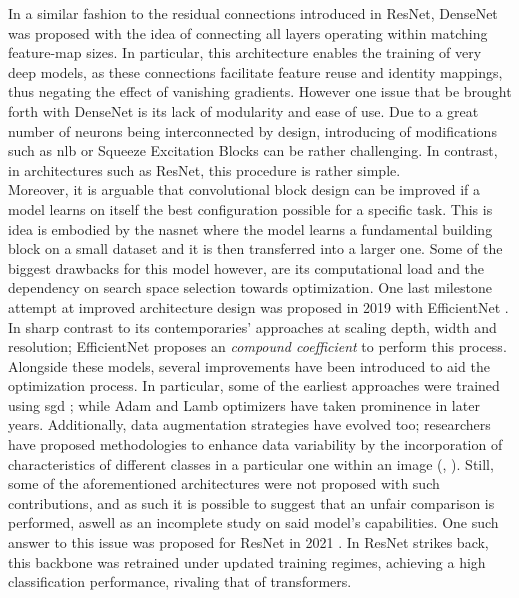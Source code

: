 \noindent In a similar fashion to the residual connections introduced in ResNet, DenseNet 
\autocite{huang2017densely} was proposed with the idea of connecting all layers operating within 
matching feature-map sizes. In particular, this architecture enables the training of very deep 
models, as these connections facilitate feature reuse and identity mappings, thus negating the 
effect of vanishing gradients. However one issue that be brought forth with DenseNet is its 
lack of  modularity and ease of use. Due to a great number of neurons being interconnected by 
design, introducing of modifications such as \gls{nlb}\autocite{wang2018non} or Squeeze Excitation 
Blocks  \autocite{hu2018squeeze} can be  rather challenging. In contrast, in architectures such as 
ResNet, this procedure is rather simple.\\

\noindent Moreover, it is arguable that convolutional block design can be improved if a model 
learns on itself the best configuration possible for a specific task. This is idea is embodied by 
the \gls{nasnet} \autocite{zoph2018learning} where the model learns a fundamental building block on a 
small dataset and it is then transferred into a larger one. Some of the biggest drawbacks for this 
model however, are its computational load and the dependency on search space selection towards 
optimization. One last milestone attempt at improved architecture design was proposed in 2019 with 
EfficientNet \autocite{tan2019efficientnet}. In sharp contrast to its contemporaries' approaches at 
scaling depth, width and resolution; EfficientNet proposes an \emph{compound coefficient} to 
perform this process.\\

\noindent Alongside these models, several improvements have been introduced to aid the optimization 
process. In particular, some of the earliest approaches were trained using \gls{sgd} 
\autocite{bottou2010large}; while Adam \autocite{kingma2014adam} and Lamb \autocite{you2019large} 
optimizers have taken prominence in later years. Additionally, data augmentation strategies have 
evolved too; researchers have proposed methodologies to enhance data variability by the 
incorporation of characteristics of different classes in a particular one within an image 
(\cite{zhang2017mixup}, \cite{yun2019cutmix}). Still, some of the aforementioned architectures 
were not proposed with such contributions, and as such it is possible to suggest that an unfair 
comparison is performed, aswell as an incomplete study on said model's capabilities. One such 
answer to this issue was proposed for ResNet in 2021 \autocite{wightman2021resnet}. In 
ResNet strikes back, this backbone was retrained under updated training regimes, achieving a 
high classification performance, rivaling that of transformers.\\

